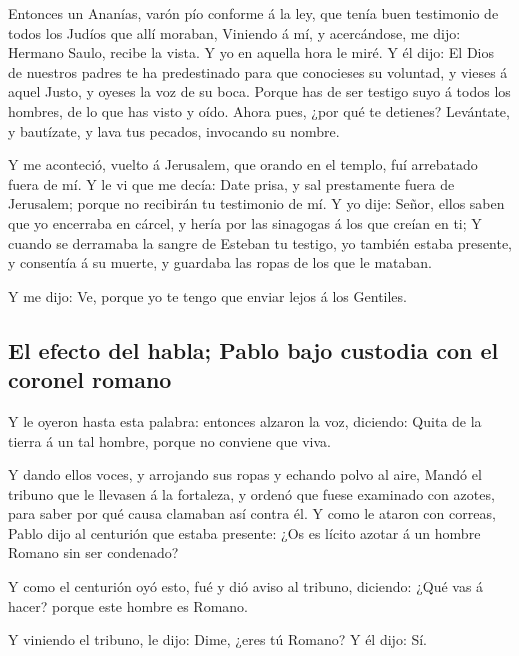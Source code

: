  Entonces un Ananías, varón pío conforme á la ley, que
tenía buen testimonio de todos los Judíos que allí moraban,
 Viniendo á mí, y acercándose, me dijo: Hermano Saulo,
recibe la vista. Y yo en aquella hora le miré.  Y él
dijo: El Dios de nuestros padres te ha predestinado para que conocieses
su voluntad, y vieses á aquel Justo, y oyeses la voz de su boca.
 Porque has de ser testigo suyo á todos los hombres, de
lo que has visto y oído.  Ahora pues, ¿por qué te
detienes? Levántate, y bautízate, y lava tus pecados, invocando su
nombre.

 Y me aconteció, vuelto á Jerusalem, que orando en el
templo, fuí arrebatado fuera de mí.  Y le vi que me
decía: Date prisa, y sal prestamente fuera de Jerusalem; porque no
recibirán tu testimonio de mí.  Y yo dije: Señor, ellos
saben que yo encerraba en cárcel, y hería por las sinagogas á los que
creían en ti;  Y cuando se derramaba la sangre de Esteban
tu testigo, yo también estaba presente, y consentía á su muerte, y
guardaba las ropas de los que le mataban.

 Y me dijo: Ve, porque yo te tengo que enviar lejos á los
Gentiles.

\hypertarget{el-efecto-del-habla-pablo-bajo-custodia-con-el-coronel-romano}{%
\subsection{El efecto del habla; Pablo bajo custodia con el coronel
romano}\label{el-efecto-del-habla-pablo-bajo-custodia-con-el-coronel-romano}}

 Y le oyeron hasta esta palabra: entonces alzaron la voz,
diciendo: Quita de la tierra á un tal hombre, porque no conviene que
viva.

 Y dando ellos voces, y arrojando sus ropas y echando
polvo al aire,  Mandó el tribuno que le llevasen á la
fortaleza, y ordenó que fuese examinado con azotes, para saber por qué
causa clamaban así contra él.  Y como le ataron con
correas, Pablo dijo al centurión que estaba presente: ¿Os es lícito
azotar á un hombre Romano sin ser condenado?

 Y como el centurión oyó esto, fué y dió aviso al
tribuno, diciendo: ¿Qué vas á hacer? porque este hombre es Romano.

 Y viniendo el tribuno, le dijo: Dime, ¿eres tú Romano? Y
él dijo: Sí.

